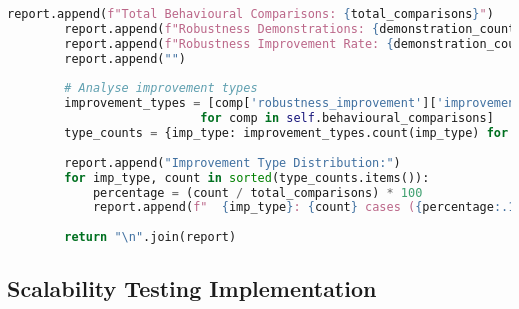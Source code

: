\begin{lstlisting}[language=Python, caption=Systematic Failure Mode Analysis and Recovery Validation]
        report.append(f"Total Behavioural Comparisons: {total_comparisons}")
        report.append(f"Robustness Demonstrations: {demonstration_count}")
        report.append(f"Robustness Improvement Rate: {demonstration_count/total_comparisons:.2%}")
        report.append("")
        
        # Analyse improvement types
        improvement_types = [comp['robustness_improvement']['improvement_type'] 
                           for comp in self.behavioural_comparisons]
        type_counts = {imp_type: improvement_types.count(imp_type) for imp_type in set(improvement_types)}
        
        report.append("Improvement Type Distribution:")
        for imp_type, count in sorted(type_counts.items()):
            percentage = (count / total_comparisons) * 100
            report.append(f"  {imp_type}: {count} cases ({percentage:.1f}%)")
        
        return "\n".join(report)
\end{lstlisting}

\subsection{Scalability Testing Implementation}
\label{appendix:scalability-testing}

